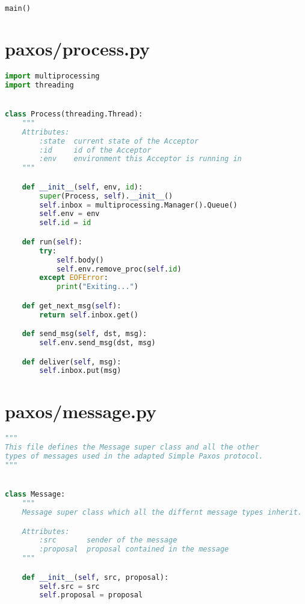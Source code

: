 \begin{landscape}
\begin{multicols*}{2}
\begin{lstlisting}[style=SourceCodeListing,language=Python]
main()
\end{lstlisting}
\end{multicols*}

\newpage

\begin{multicols*}{2}
\section{paxos/process.py}
\begin{lstlisting}[style=SourceCodeListing,language=Python]
import multiprocessing
import threading


class Process(threading.Thread):
    """
    Attributes:
        :state  current state of the Acceptor
        :id     id of the Acceptor
        :env    environment this Acceptor is running in
    """

    def __init__(self, env, id):
        super(Process, self).__init__()
        self.inbox = multiprocessing.Manager().Queue()
        self.env = env
        self.id = id

    def run(self):
        try:
            self.body()
            self.env.remove_proc(self.id)
        except EOFError:
            print("Exiting...")

    def get_next_msg(self):
        return self.inbox.get()

    def send_msg(self, dst, msg):
        self.env.send_msg(dst, msg)

    def deliver(self, msg):
        self.inbox.put(msg)
\end{lstlisting}

\vfill\null
\columnbreak

\section{paxos/message.py}
\begin{lstlisting}[style=SourceCodeListing,language=Python]
"""
This file defines the Message super class and all the other
types of messages used in the adapted Simple Paxos protocol.
"""


class Message:
    """
    Message super class which all the differnt message types inherit.

    Attributes:
        :src       sender of the message
        :proposal  proposal contained in the message
    """

    def __init__(self, src, proposal):
        self.src = src
        self.proposal = proposal


\end{lstlisting}
\end{multicols*}
\end{landscape}
